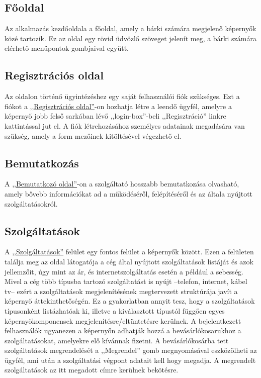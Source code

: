 \documentclass[centeredchapter]{thesis-ekf}
\theoremstyle{definition}
\theoremstyle{remark}
\begin{document}
\subsection{Főoldal}\hypertarget{leiras-fooldal}{}

Az alkalmazás kezdőoldala a főoldal, amely a bárki számára megjelenő képernyők közé tartozik. Ez az oldal egy rövid üdvözlő szöveget jelenít meg, a bárki számára elérhető menüpontok gombjaival együtt.

\subsection{Regisztrációs oldal}\hypertarget{leiras-regisztracios}{}

Az oldalon történő ügyintézéshez egy saját felhasználói fiók szükséges. Ezt a fiókot a \hyperlink{leiras-regisztracios}{,,Regisztrációs oldal''}-on hozhatja létre a leendő ügyfél, amelyre a képernyő jobb felső sarkában lévő ,,login-box''-beli ,,Regisztráció'' linkre kattintással jut el. A fiók létrehozásához személyes adatainak megadására van szükség, amely a form mezőinek kitöltésével végezhető el.  

\subsection{Bemutatkozás}\hypertarget{leiras-bemutatkozo}{}

A \hyperlink{leiras-bemutatkozo}{,,Bemutatkozó oldal''}-on a szolgáltató hosszabb bemutatkozása olvasható, amely bővebb információkat ad a működéséről, felépítéséről és az általa nyújtott szolgáltatásokról.

\subsection{Szolgáltatások}\hypertarget{leiras-szolgaltatasok}{}

A \hyperlink{leiras-szolgaltatasok}{,,Szolgáltatások''} felület egy fontos felület a képernyők között. Ezen a felületen találja meg az oldal látogatója a cég által nyújtott szolgáltatások listáját és azok jellemzőit, úgy mint az ár, és internetszolgáltatás esetén a például a sebesség. Mivel a cég több típusba tartozó szolgáltatást is nyújt --telefon, internet, kábel tv-- ezért a szolgáltatások megjelenítésének megtervezett struktúrája javít a képernyő áttekinthetőségén. Ez a gyakorlatban annyit tesz, hogy a szolgáltatások típusonként listázhatóak ki, illetve a kiválasztott típustól függően egyes képernyőkomponensek megjelenítésre/eltüntetésre kerülnek.
A bejelentkezett felhasználók ugyanezen a képernyőn adhatják hozzá a bevásárlókosarukhoz a szolgáltatásokat, amelyekre elő kívánnak fizetni. A bevásárlókosárba tett szolgáltatások megrendelését a ,,Megrendel'' gomb megnyomásával eszközölheti az ügyfél, ami után a szolgáltatási végpont adatait kell hogy megadja. A megrendelt szolgáltatások az itt megadott címre kerülnek bekötésre.
\end{document}
